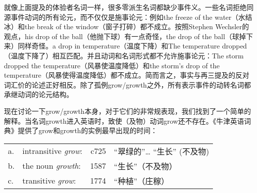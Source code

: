 \begin{exe}
\begin{xlist}[iv.]
\begin{exe}
\begin{xlist}[iv.]
就像上面提及的体验者名词一样，很多零派生名词都缺少事件义。一些名词拒绝同源事件动词的所有论元，而不仅仅是施事论元：例如the freeze of the water（水结冰）和the break of the window（窗子打碎）都不成立。按照Stephen Wechsler的观点，his drop of the ball（他抛下球）有一点奇怪，the drop of the ball（球掉下来）同样奇怪。a drop in temperature（温度下降）和The temperature dropped（温度下降了）相互匹配。并且动词和名词形式都不允许施事论元：The storm
  dropped the temperature（风暴使温度降低）和the storm's drop of the temperature（风暴使得温度降低）都不成立。简而言之，事实与再三提及的反对词汇价的论述正好相反。除了孤例grow/growth之外，所有表示事件的动转名词都承继动词的论元结构。

现在讨论一下grow/growth本身，对于它们的非常规表现，我们找到了一个简单的解释\citep{Wechsler2008a}。当名词growth进入英语时，致使（及物）动词grow还不存在。《牛津英语词典》提供了grow和growth的实例最早出现的时间：

\ea
\label{oed}
\begin{tabular}[t]{@{}l@{~}lrl@{}} 
a. & intransitive \emph{grow}: &  c725	& “翠绿的”\ldots{} “生长” (不及物)\\
b. & the noun \emph{growth}:   &  1587	& “生长”（不及物）\\
c. & transitive \emph{grow}:   &  1774	& “种植”（庄稼）\\
\end{tabular}
\z


\end{xlist}
\end{exe}
\end{xlist}
\end{exe}
